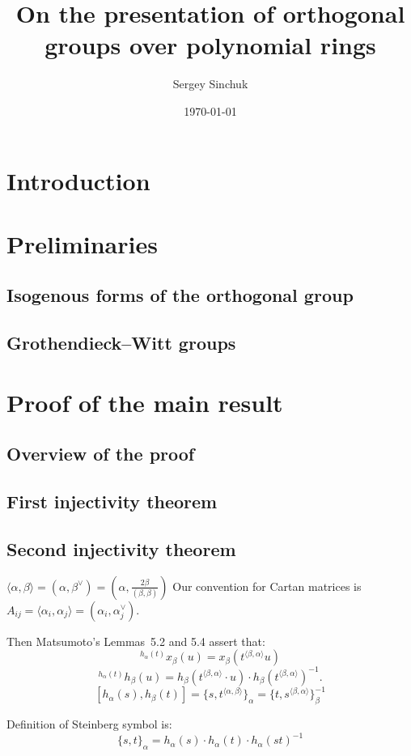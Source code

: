\documentclass[oneside, 10pt]{amsart}
\title{On the presentation of orthogonal groups over polynomial rings}
\author {Sergey Sinchuk}
\date {\today}
\theoremstyle{remark} %
\theoremstyle{definition}
\begin{document}
\maketitle
\section{Introduction}
\section{Preliminaries}
\subsection{Isogenous forms of the orthogonal group}
\subsection{Grothendieck--Witt groups}
\section{Proof of the main result}
\subsection{Overview of the proof}
\subsection{First injectivity theorem}
\subsection{Second injectivity theorem}

$\langle \alpha, \beta \rangle = (\alpha, \beta^\vee) = (\alpha, \frac{2\beta}{(\beta, \beta)})$
Our convention for Cartan matrices is 
$A_{ij} = \langle \alpha_i, \alpha_j \rangle = (\alpha_i, \alpha_j^\vee)$.

Then Matsumoto's Lemmas~5.2 and 5.4 assert that:
\[ {}^{h_\alpha(t)}\!x_\beta(u) = x_\beta(t^{\langle \beta,  \alpha \rangle}u)\]
\[ {}^{h_\alpha(t)}\!h_\beta(u) = h_\beta(t^{\langle \beta, \alpha \rangle} \cdot u) \cdot h_\beta(t^{\langle \beta,  \alpha \rangle})^{-1}. \]
\[[h_\alpha(s), h_\beta(t)] = \{s, t^{\langle \alpha, \beta \rangle}\}_\alpha = \{t, s^{\langle \beta, \alpha \rangle}\}_\beta^{-1}\]

Definition of Steinberg symbol is:
\[ \{ s, t \}_\alpha = h_\alpha(s) \cdot h_\alpha(t) \cdot h_\alpha(st)^{-1} \]
\end{document}
